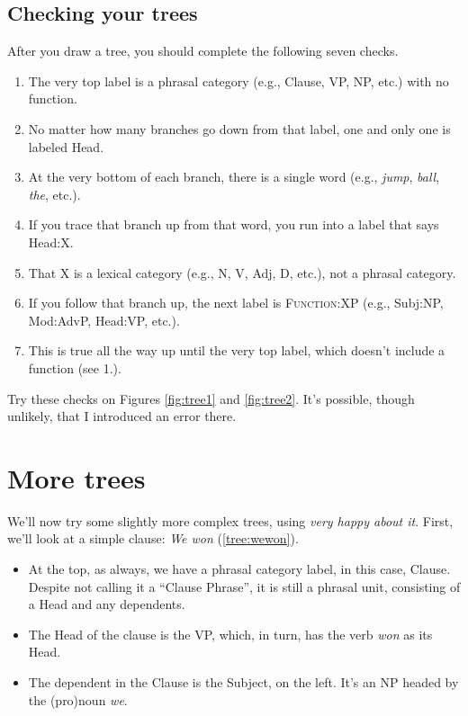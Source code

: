 \subsection{Checking your trees}\label{sec:checkTrees}

After you draw a tree, you should complete the following seven checks.

\begin{enumerate}[noitemsep]
    \item The very top label is a phrasal category (e.g., Clause, VP, NP, etc.) with no function.
    \item No matter how many branches go down from that label, one and only one is labeled Head.
    \item At the very bottom of each branch, there is a single word (e.g., \textit{jump}, \textit{ball}, \textit{the}, etc.).
    \item If you trace that branch up from that word, you run into a label that says Head:X.
    \item That X is a lexical category (e.g., N, V, Adj, D, etc.), not a phrasal category.
    \item If you follow that branch up, the next label is \textsc{Function}:XP (e.g., Subj:NP, Mod:AdvP, Head:VP, etc.).
    \item This is true all the way up until the very top label, which doesn't include a function (see 1.).
\end{enumerate}

Try these checks on Figures \ref{fig:tree1} and \ref{fig:tree2}. It's possible, though unlikely, that I introduced an error there.

\section{More trees}\label{sec:more trees}

We'll now try some slightly more complex trees, using \textit{very happy about it}. First, we'll look at a simple clause: \textit{We won} (\ref{tree:wewon}).
\begin{itemize}[noitemsep]
    \item At the top, as always, we have a phrasal category label, in this case, Clause. Despite not calling it a ``Clause Phrase'', it is still a phrasal unit, consisting of a Head and any dependents.
    \item The Head of the clause is the VP, which, in turn, has the verb \textit{won} as its Head.
    \item The dependent in the Clause is the Subject, on the left. It's an NP headed by the (pro)noun \textit{we}.
\end{itemize}


